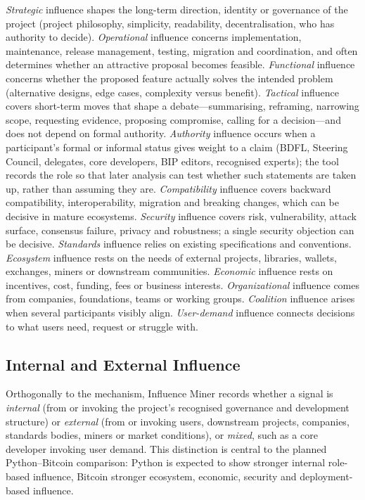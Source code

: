 \documentclass[sigconf,screen]{acmart}
\begin{document}
\emph{Strategic} influence shapes the long-term direction, identity or governance of the project (project philosophy, simplicity, readability, decentralisation, who has authority to decide). \emph{Operational} influence concerns implementation, maintenance, release management, testing, migration and coordination, and often determines whether an attractive proposal becomes feasible. \emph{Functional} influence concerns whether the proposed feature actually solves the intended problem (alternative designs, edge cases, complexity versus benefit). \emph{Tactical} influence covers short-term moves that shape a debate---summarising, reframing, narrowing scope, requesting evidence, proposing compromise, calling for a decision---and does not depend on formal authority. \emph{Authority} influence occurs when a participant's formal or informal status gives weight to a claim (BDFL, Steering Council, delegates, core developers, BIP editors, recognised experts); the tool records the role so that later analysis can test whether such statements are taken up, rather than assuming they are. \emph{Compatibility} influence covers backward compatibility, interoperability, migration and breaking changes, which can be decisive in mature ecosystems. \emph{Security} influence covers risk, vulnerability, attack surface, consensus failure, privacy and robustness; a single security objection can be decisive. \emph{Standards} influence relies on existing specifications and conventions. \emph{Ecosystem} influence rests on the needs of external projects, libraries, wallets, exchanges, miners or downstream communities. \emph{Economic} influence rests on incentives, cost, funding, fees or business interests. \emph{Organizational} influence comes from companies, foundations, teams or working groups. \emph{Coalition} influence arises when several participants visibly align. \emph{User-demand} influence connects decisions to what users need, request or struggle with.

\subsection{Internal and External Influence}

Orthogonally to the mechanism, Influence Miner records whether a signal is \emph{internal} (from or invoking the project's recognised governance and development structure) or \emph{external} (from or invoking users, downstream projects, companies, standards bodies, miners or market conditions), or \emph{mixed}, such as a core developer invoking user demand. This distinction is central to the planned Python--Bitcoin comparison: Python is expected to show stronger internal role-based influence, Bitcoin stronger ecosystem, economic, security and deployment-based influence.
\end{document}
